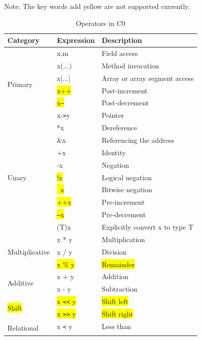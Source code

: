\documentclass[a4paper]{article}
\begin{document}
\begin{table}[htbp]
\centering
\caption{Operators in C0}
\begin{tablenotes}
\centering
\small
\item Note: The key words add yellow are not supported currently.
\end{tablenotes}
\begin{tabular}{|l|l|l|}
\hline
Category & Expression & Description\\
\hline
\multirow{6}{*}{Primary} & x.m & Field access\\\cline{2-3}
 & x(...) & Method invocation\\\cline{2-3}
 & x[...] & Array or array segment access\\\cline{2-3}
 & \colorbox{yellow}{x++} & Post-increment\\\cline{2-3}
 & \colorbox{yellow}{x\texttt{--}} & Post-decrement\\\cline{2-3}
 & x-\texttt{>}y & Pointer\\ \hline
\multirow{9}{*}{Unary} & *x & Dereference\\\cline{2-3}
 & \&x & Referencing the address\\\cline{2-3}
 & +x & Identity\\\cline{2-3}
 & -x & Negation\\\cline{2-3}
 & \colorbox{yellow}{!x} & Logical negation\\\cline{2-3}
 & \colorbox{yellow}{~x} & Bitwise negation\\\cline{2-3}
 & \colorbox{yellow}{++x} & Pre-increment\\\cline{2-3}
 & \colorbox{yellow}{\texttt{--}x} & Pre-decrement\\\cline{2-3}
 & (T)x & Explicitly convert x to type T\\ \hline
\multirow{3}{*}{Multiplicative} & x * y & Multiplication\\\cline{2-3}
 & x / y & Division\\\cline{2-3}
 & \colorbox{yellow}{x \% y} & \colorbox{yellow}{Remainder}\\ \hline
\multirow{2}{*}{Additive} & x + y & Addition\\\cline{2-3}
 & x - y & Subtraction\\ \hline
\multirow{2}{*}{\colorbox{yellow}{Shift}} & \colorbox{yellow}{x \texttt{<<} y} & \colorbox{yellow}{Shift left}\\\cline{2-3}
 & \colorbox{yellow}{x \texttt{>>} y} & \colorbox{yellow}{Shift right}\\ \hline
\multirow{4}{*}{Relational} & x \texttt{<} y & Less than\\\cline{2-3}

\end{tabular}
\end{table}
\end{document}
